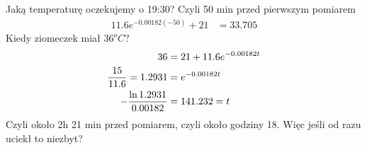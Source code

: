 \documentclass{article}
\begin{document}
Jaką temperaturę oczekujemy o 19:30? Czyli 50 min przed pierwszym pomiarem
\begin{align*}
    11.6e^{-0.00182(-50)}+21&=33.705
\end{align*}
Kiedy ziomeczek miał $36^oC$?
\begin{align*}
    36&=21+11.6e^{-0.00182t}\\
    {15\over 11.6}=1.2931&=e^{-0.00182t}\\
    -{\ln1.2931\over0.00182}&=141.232=t
\end{align*}
Czyli około 2h 21 min przed pomiarem, czyli około godziny 18. Więc jeśli od razu uciekł to niezbyt?
\end{document}
